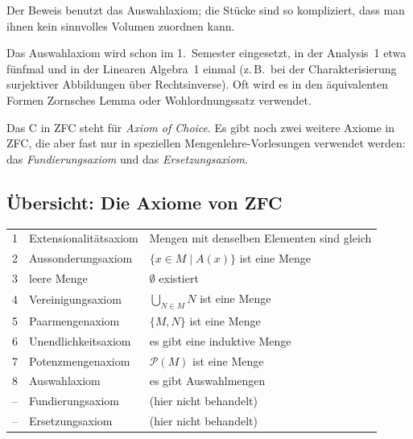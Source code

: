 \documentclass[a4paper]{article}
\theoremstyle{kurzskript}
\newcommand{\Pot}{\mathcal{P}}
\begin{document}
Der Beweis benutzt das Auswahlaxiom; die Stücke sind so kompliziert, dass man ihnen kein sinnvolles Volumen zuordnen kann.

Das Auswahlaxiom wird schon im 1.~Semester eingesetzt, in der Analysis~1 etwa fünfmal und in der Linearen Algebra~1 einmal (z.\,B.\ bei der Charakterisierung surjektiver Abbildungen über Rechtsinverse). Oft wird es in den äquivalenten Formen \glqq Zornsches Lemma\grqq{} oder \glqq Wohlordnungssatz\grqq{} verwendet.

Das \glqq C\grqq{} in ZFC steht für \emph{Axiom of Choice}. Es gibt noch zwei weitere Axiome in ZFC, die aber fast nur in speziellen Mengenlehre-Vorlesungen verwendet werden: das \emph{Fundierungsaxiom} und das \emph{Ersetzungsaxiom}.

\subsection*{Übersicht: Die Axiome von ZFC}
\begin{center}
\begin{tabular}{rll}
1 & Extensionalitätsaxiom & Mengen mit denselben Elementen sind gleich\\
2 & Aussonderungsaxiom & $\{x \in M \mid A(x)\}$ ist eine Menge\\
3 & leere Menge & $\emptyset$ existiert\\
4 & Vereinigungsaxiom & $\bigcup_{N \in M} N$ ist eine Menge\\
5 & Paarmengenaxiom & $\{M, N\}$ ist eine Menge\\
6 & Unendlichkeitsaxiom & es gibt eine induktive Menge\\
7 & Potenzmengenaxiom & $\Pot(M)$ ist eine Menge\\
8 & Auswahlaxiom & es gibt Auswahlmengen\\
-- & Fundierungsaxiom & (hier nicht behandelt)\\
-- & Ersetzungsaxiom & (hier nicht behandelt)
\end{tabular}
\end{center}
\end{document}
